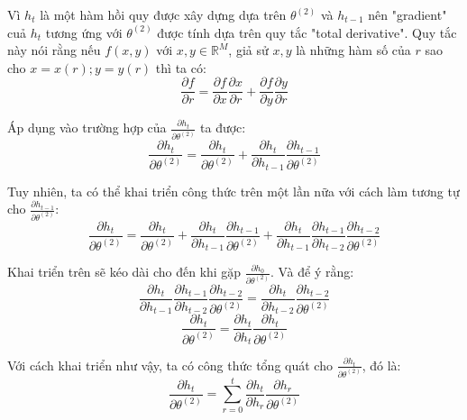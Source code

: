 Vì $h_t$ là một hàm hồi quy được xây dựng dựa trên $\theta^{(2)}$ và $h_{t-1}$ nên "gradient" cuả $h_t$ tương ứng với $\theta^{(2)}$ được tính dựa trên quy tắc "total derivative". Quy tắc này nói rằng nếu $f(x,y)$ với $x, y \in \mathbb{R}^M$, giả sử $x,y$ là những hàm số của $r$ sao cho $x = x(r); y = y(r)$ thì ta có:
\begin{equation} \label{gradientWRTSt6}
	\frac{\partial{f}}{\partial{r}} = \frac{\partial f}{\partial x}\frac{\partial x }{\partial r} + \frac{\partial f }{\partial y }\frac{\partial y }{\partial r }
\end{equation}

Áp dụng vào trường hợp của $\frac{\partial h_t}{\partial \theta^{(2)} }$ ta được:
\begin{equation} \label{gradientWRTSt7}
	\frac{\partial h_t}{ \partial \theta^{(2)}} = \frac{\partial h_t}{ \partial \theta^{(2)}} + \frac{\partial h_t }{\partial h_{t-1} } \frac{\partial h_{t-1}}{ \partial \theta^{(2)}}
\end{equation}

Tuy nhiên, ta có thể khai triển công thức trên một lần nữa với cách làm tương tự cho $\frac{\partial h_{t-1}}{\partial \theta^{(2)} }$:
\begin{equation} \label{gradientWRTSt8}
	\frac{\partial h_t}{\partial \theta^{(2)}} = \frac{\partial h_t}{\partial \theta^{(2)}} + \frac{\partial h_t }{\partial h_{t-1}} \frac{\partial h_{t-1}}{\partial \theta^{(2)}} + \frac{\partial h_t}{\partial h_{t-1}} \frac{\partial h_{t-1}}{\partial h_{t-2}} \frac{\partial h_{t-2}}{\partial \theta^{(2)}}
\end{equation}

Khai triển trên sẽ kéo dài cho đến khi gặp $\frac{\partial h_0}{\partial \theta^{(2)}}$. Và để ý rằng:
\begin{equation} \label{gradientWRTSt9}
	\frac{\partial h_t}{\partial h_{t-1}} \frac{\partial h_{t-1}}{\partial h_{t-2}} \frac{\partial h_{t-2}}{\partial \theta^{(2)}} = \frac{\partial h_t}{\partial h_{t-2}}\frac{\partial h_{t-2}}{\partial \theta^{(2)}}
\end{equation}
\begin{equation} \label{gradientWRTSt10}
	\frac{\partial h_{t}}{\partial \theta^{(2)}} = \frac{\partial h_{t}}{\partial h_t} \frac{\partial h_t}{\partial \theta^{(2)}}
\end{equation}

Với cách khai triển như vậy, ta có công thức tổng quát cho $\frac{\partial h_t}{\partial \theta^{(2)}}$, đó là:
\begin{equation} \label{gradientWRTSt11}
	\frac{\partial h_t}{\partial \theta^{(2)}} = \sum_{r=0}^{t} \frac{\partial h_{t}}{\partial h_r} \frac{\partial h_r}{\partial \theta^{(2)}}
\end{equation}

